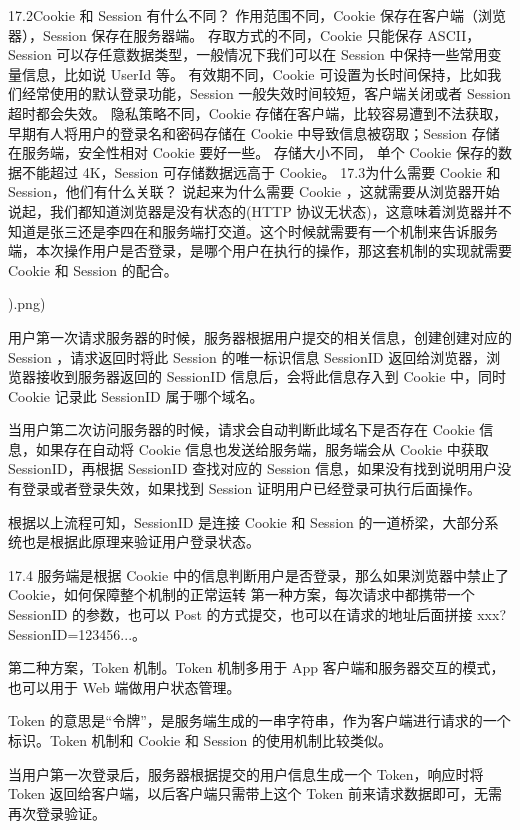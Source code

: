 \documentclass[UTF8]{ctexart}
\begin{document}
17.2Cookie 和 Session 有什么不同？
作用范围不同，Cookie 保存在客户端（浏览器），Session 保存在服务器端。
存取方式的不同，Cookie 只能保存 ASCII，Session 可以存任意数据类型，一般情况下我们可以在 Session 中保持一些常用变量信息，比如说 UserId 等。
有效期不同，Cookie 可设置为长时间保持，比如我们经常使用的默认登录功能，Session 一般失效时间较短，客户端关闭或者 Session 超时都会失效。
隐私策略不同，Cookie 存储在客户端，比较容易遭到不法获取，早期有人将用户的登录名和密码存储在 Cookie 中导致信息被窃取；Session 存储在服务端，安全性相对 Cookie 要好一些。
存储大小不同， 单个 Cookie 保存的数据不能超过 4K，Session 可存储数据远高于 Cookie。
17.3为什么需要 Cookie 和 Session，他们有什么关联？
说起来为什么需要 Cookie ，这就需要从浏览器开始说起，我们都知道浏览器是没有状态的(HTTP 协议无状态)，这意味着浏览器并不知道是张三还是李四在和服务端打交道。这个时候就需要有一个机制来告诉服务端，本次操作用户是否登录，是哪个用户在执行的操作，那这套机制的实现就需要 Cookie 和 Session 的配合。

).png)

用户第一次请求服务器的时候，服务器根据用户提交的相关信息，创建创建对应的 Session ，请求返回时将此 Session 的唯一标识信息 SessionID 返回给浏览器，浏览器接收到服务器返回的 SessionID 信息后，会将此信息存入到 Cookie 中，同时 Cookie 记录此 SessionID 属于哪个域名。

当用户第二次访问服务器的时候，请求会自动判断此域名下是否存在 Cookie 信息，如果存在自动将 Cookie 信息也发送给服务端，服务端会从 Cookie 中获取 SessionID，再根据 SessionID 查找对应的 Session 信息，如果没有找到说明用户没有登录或者登录失效，如果找到 Session 证明用户已经登录可执行后面操作。

根据以上流程可知，SessionID 是连接 Cookie 和 Session 的一道桥梁，大部分系统也是根据此原理来验证用户登录状态。

17.4 服务端是根据 Cookie 中的信息判断用户是否登录，那么如果浏览器中禁止了 Cookie，如何保障整个机制的正常运转
第一种方案，每次请求中都携带一个 SessionID 的参数，也可以 Post 的方式提交，也可以在请求的地址后面拼接 xxx?SessionID=123456...。

第二种方案，Token 机制。Token 机制多用于 App 客户端和服务器交互的模式，也可以用于 Web 端做用户状态管理。

Token 的意思是“令牌”，是服务端生成的一串字符串，作为客户端进行请求的一个标识。Token 机制和 Cookie 和 Session 的使用机制比较类似。

当用户第一次登录后，服务器根据提交的用户信息生成一个 Token，响应时将 Token 返回给客户端，以后客户端只需带上这个 Token 前来请求数据即可，无需再次登录验证。
\end{document}
